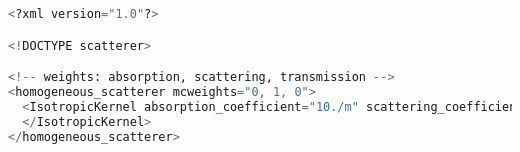 \begin{lstlisting}[language=python]
<?xml version="1.0"?>

<!DOCTYPE scatterer>

<!-- weights: absorption, scattering, transmission -->
<homogeneous_scatterer mcweights="0, 1, 0">
  <IsotropicKernel absorption_coefficient="10./m" scattering_coefficient="10./m">
  </IsotropicKernel>
</homogeneous_scatterer>
\end{lstlisting}
